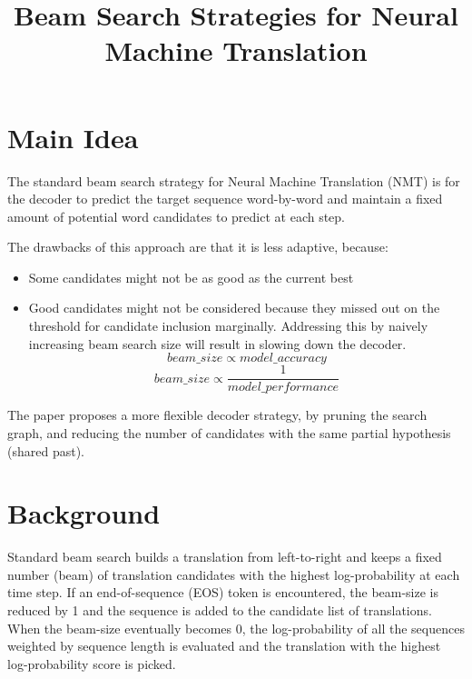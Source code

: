 \documentclass[12pt]{scrartcl}
\begin{document}
\title{Beam Search Strategies for Neural Machine Translation}
\author{}
\date{}
\maketitle

\section{Main Idea}
  The standard beam search strategy for Neural Machine Translation (NMT) is for the decoder to predict the target sequence word-by-word and maintain a fixed amount of potential word candidates to predict at each step. 
  
  The drawbacks of this approach are that it is less adaptive, because: 
  \begin{itemize}
    \item Some candidates might not be as good as the current best
    \item Good candidates might not be considered because they missed out on the threshold for candidate inclusion marginally. Addressing this by naively increasing beam search size will result in slowing down the decoder.
    $$beam\_size \propto model\_accuracy$$
    $$beam\_size \propto \frac{1}{model\_performance}$$
  \end{itemize}

  The paper proposes a more flexible decoder strategy, by pruning the search graph, and reducing the number of candidates with the same partial hypothesis (shared past).

\section{Background}
  Standard beam search builds a translation from left-to-right and keeps a fixed
  number (beam) of translation candidates with the highest log-probability at each time step. If an end-of-sequence (EOS) token is encountered, the beam-size is reduced by 1 and the sequence is added to the candidate list of translations. When the beam-size eventually becomes 0, the log-probability of all the sequences weighted by sequence length is evaluated and the translation with the highest log-probability score is picked.
\end{document}

